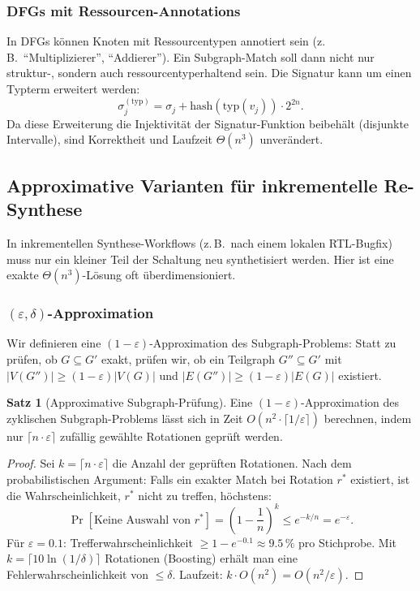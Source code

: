 ﻿\documentclass[a4paper,12pt]{article}
\theoremstyle{definition}
\newtheorem{satz}{Satz}
\begin{document}
\subsubsection{DFGs mit Ressourcen-Annotations}

In DFGs können Knoten mit Ressourcentypen annotiert sein (z.\,B.\ ``Multiplizierer'',
``Addierer''). Ein Subgraph-Match soll dann nicht nur struktur-, sondern auch
ressourcentyperhaltend sein. Die Signatur kann um einen Typterm erweitert werden:
\[
  \sigma_j^{(\text{typ})} = \sigma_j + \text{hash}(\text{typ}(v_j)) \cdot 2^{2n}.
\]
Da diese Erweiterung die Injektivität der Signatur-Funktion beibehält (disjunkte
Intervalle), sind Korrektheit und Laufzeit $\Theta(n^3)$ unverändert.

\subsection{Approximative Varianten für inkrementelle Re-Synthese}

In inkrementellen Synthese-Workflows (z.\,B.\ nach einem lokalen RTL-Bugfix) muss
nur ein kleiner Teil der Schaltung neu synthetisiert werden. Hier ist eine exakte
$\Theta(n^3)$-Lösung oft überdimensioniert.

\subsubsection{$(\varepsilon, \delta)$-Approximation}

Wir definieren eine $(1-\varepsilon)$-Approximation des Subgraph-Problems: Statt zu prüfen,
ob $G \subseteq G'$ exakt, prüfen wir, ob ein Teilgraph $G'' \subseteq G'$ mit
$|V(G'')| \geq (1-\varepsilon)|V(G)|$ und $|E(G'')| \geq (1-\varepsilon)|E(G)|$ existiert.

\begin{satz}[Approximative Subgraph-Prüfung]\label{satz:approx}
  Eine $(1-\varepsilon)$-Approximation des zyklischen Subgraph-Problems lässt sich in
  Zeit $O\!\left(n^2 \cdot \lceil 1/\varepsilon \rceil\right)$ berechnen, indem nur
  $\lceil n \cdot \varepsilon \rceil$ zufällig gewählte Rotationen geprüft werden.
\end{satz}

\begin{proof}
  Sei $k = \lceil n \cdot \varepsilon \rceil$ die Anzahl der geprüften Rotationen.
  Nach dem probabilistischen Argument: Falls ein exakter Match bei Rotation $r^*$ existiert,
  ist die Wahrscheinlichkeit, $r^*$ nicht zu treffen, höchstens:
  \[
    \Pr[\text{Keine Auswahl von } r^*] = \left(1 - \frac{1}{n}\right)^k
    \leq e^{-k/n} = e^{-\varepsilon}.
  \]
  Für $\varepsilon = 0.1$: Trefferwahrscheinlichkeit $\geq 1 - e^{-0.1} \approx 9.5\,\%$
  pro Stichprobe. Mit $k = \lceil 10\ln(1/\delta)\rceil$ Rotationen (Boosting) erhält
  man eine Fehlerwahrscheinlichkeit von $\leq \delta$.
  Laufzeit: $k \cdot O(n^2) = O(n^2 / \varepsilon)$.
\end{proof}
\end{document}
